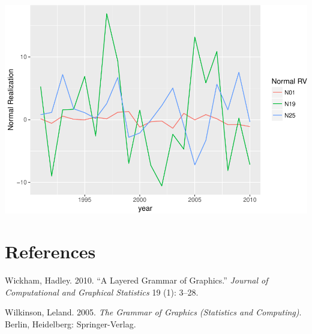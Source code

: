 \documentclass[]{article}
\begin{document}
\includegraphics{Intro_ggplot_files/figure-latex/wide_vs_long-2.pdf}

\section*{References}\label{references}

\hypertarget{refs}{}
\hypertarget{ref-Wickham:2010}{}
Wickham, Hadley. 2010. ``A Layered Grammar of Graphics.'' \emph{Journal
of Computational and Graphical Statistics} 19 (1): 3--28.

\hypertarget{ref-Wilkinson:2005}{}
Wilkinson, Leland. 2005. \emph{The Grammar of Graphics (Statistics and
Computing)}. Berlin, Heidelberg: Springer-Verlag.
\end{document}
